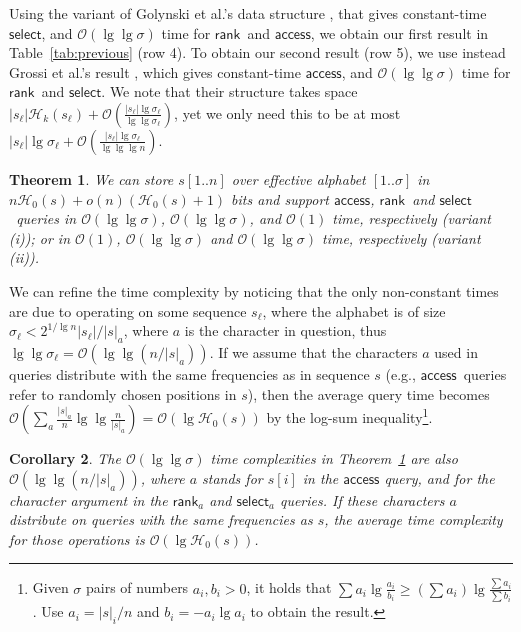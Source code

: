 \documentclass[11pt]{article}
\newtheorem{theorem}{Theorem}
\newtheorem{corollary}[theorem]{Corollary}
\newcommand{\Oh}[1]
    {\ensuremath{\mathcal{O}\left( {#1} \right)}}
\newcommand{\occ}[2]
    {\ensuremath{|{#2}|_{#1}}}
\newcommand{\access}
    {\ensuremath{\mathsf{access}}}
\newcommand{\rank}
    {\ensuremath{\mathsf{rank}}}
\newcommand{\select}
    {\ensuremath{\mathsf{select}}}
\newcommand{\HH}{\mathcal{H}}
\newcommand{\Ho}{\HH_0}
\newcommand{\Hk}{\HH_k}
\begin{document}
Using the variant of Golynski et al.'s data structure \cite[Thm.~4.2]{GMR06}, 
that gives constant-time \select, and $\Oh{\lg\lg\sigma}$ time for \rank\ and
\access, we obtain our first result in Table~\ref{tab:previous} (row 4). 
To obtain our second result (row 5), we use instead Grossi et al.'s result 
\cite[Cor.~2]{GOR10}, which gives constant-time \access, and $\Oh{\lg\lg\sigma}$
time for \rank\ and \select. We note that their structure takes space 
$|s_\ell|\Hk(s_\ell)+ \Oh{\frac{|s_\ell|\lg\sigma_\ell}{\lg\lg\sigma_\ell}}$, 
yet we only need this to be at most 
$|s_\ell|\lg\sigma_\ell + \Oh{\frac{|s_\ell|\lg\sigma_\ell}{\lg\lg\lg n}}$.

\begin{theorem} \label{thm:partitioning}
We can store $s[1..n]$ over effective alphabet $[1..\sigma]$ in
\(n \Ho (s) + o(n)(\Ho (s) + 1)\) 
bits and support \access, \rank\ and \select\ queries in
$\Oh{\lg \lg \sigma}$, $\Oh{\lg \lg \sigma}$, and $\Oh{1}$ time,
respectively (variant (i)); or in
$\Oh{1}$, $\Oh{\lg \lg \sigma}$ and
$\Oh{\lg \lg \sigma}$ time, respectively (variant (ii)).
\end{theorem}

We can refine
the time complexity by noticing that the only non-constant times are due to
operating on some sequence $s_\ell$, where the alphabet is of size
$\sigma_\ell < 2^{1/\lg n}|s_\ell|/\occ{a}{s}$, where $a$ is the character
in question, thus $\lg\lg\sigma_\ell = \Oh{\lg\lg(n/\occ{a}{s})}$. If we
assume that the characters $a$ used in queries distribute with the same
frequencies as in sequence $s$ (e.g., \access\ queries refer to randomly chosen
positions in $s$), then the average query time becomes 
$\Oh{\sum_a \frac{\occ{a}{s}}{n} \lg\lg\frac{n}{\occ{a}{s}}} = \Oh{\lg \Ho(s)}$
by the log-sum inequality\footnote{Given $\sigma$ pairs of numbers 
$a_i,b_i>0$, it holds that $\sum a_i \lg\frac{a_i}{b_i} \ge
\left(\sum a_i\right)\lg\frac{\sum a_i}{\sum b_i}$.
Use $a_i = \occ{i}{s}/n$ and $b_i = - a_i \lg a_i$ to obtain the result.}.

\begin{corollary} \label{cor:partitioning-avg}
The $\Oh{\lg\lg \sigma}$ time complexities in
Theorem~\ref{thm:partitioning} are also
$\Oh{\lg\lg (n/\occ{a}{s})}$, where $a$ stands for $s[i]$ in the 
{\access} query, and for the character argument in the 
$\rank_a$ and $\select_a$ queries. If these characters $a$ distribute on queries
with the same frequencies as $s$, the average time complexity for those
operations is $\Oh{\lg \Ho(s)}$.
\end{corollary}
\end{document}

